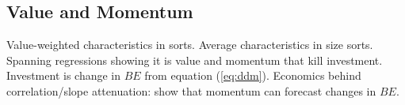 
\subsection{Value and Momentum}

Value-weighted characteristics in sorts. Average characteristics in size sorts. Spanning
regressions showing it is value and momentum that kill investment. Investment is change in
$BE$ from equation (\ref{eq:ddm}). Economics behind correlation/slope attenuation:
\textcite{asness2013devil} show that momentum  can forecast changes in $BE$.
